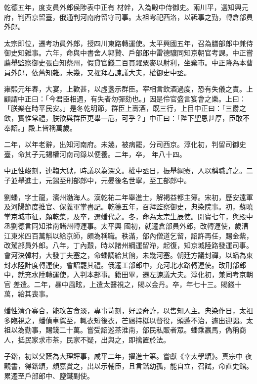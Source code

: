 \begin{pinyinscope}
 乾德五年，度支員外郎侯陟表中正有
 材幹，入為殿中侍御史。兩川平，選知興元府，判西京留臺，俄通判河南府留守司事。太祖雩祀西洛，以祗事之勤，轉倉部員外郎。



 太宗即位，遷考功員外郎，授四川東路轉運使。太平興國五年，召為膳部郎中兼侍御史知雜事。六年，命與中書舍人郭贄、戶部郎中雷德驤同知京朝官考課。中正嘗薦舉監察御史張白知蔡州，假貸官錢二百貫糴粟麥以射利，坐棄市。中正降為本曹員外郎，依舊知雜。未幾，又擢拜右諫議大夫，權御史中丞。



 雍熙元年春，大宴，上歡甚，以虛盞示群臣。宰相言飲酒過度，恐有失儀之責。上顧謂中正曰：「今君臣相遇，有失者勿彈劾也。」因是伶官盛言宴會之樂。上曰：「朕樂在時平民安。」是冬乾明節，群臣上壽酒，既三行，上目中正曰：「三爵之飲，實惟常禮，朕欲與群臣更舉一卮，可乎？」中正曰：「陛下聖恩甚厚，臣敢不奉詔。」殿上皆稱萬歲。



 二年，以年老辭，出知河南府。未幾，被病罷，分司西京。淳化初，判留司御史臺，命其子元錫權河南司錄以便養。二年，卒，
 年八十四。



 中正性峻刻，連鞫大獄，時議以為深文。權中丞日，振舉綱憲，人以稱職許之。二子並舉進士，元錫至刑部郎中，元晏後名世寧，至工部郎中。



 劉蟠，字士龍，濱州渤海人。漢乾祐二年舉進士，解褐益都主簿。宋初，歷安遠軍及河陽節度推官、保義軍掌書記。乾德五年，召拜監察御史，典染院事。初，蘇曉掌京城市征，頗乾集，及卒，選蟠代之。冬，命為太宗生辰使。開寶七年，與殿中丞劉德言同知淮南諸州轉運事。太平興
 國初，就遷倉部員外郎，改轉運使，歲漕江東米四百萬斛以給京師，頗為稱職。秩滿，部內僧道乞留，詔許再任，賜金紫，改駕部員外郎。八年，丁內艱，時以諸州綱運留滯，起復，知京城陸路發運司事。會河決韓村，大發丁夫塞之，命蟠調給其餉，未幾河塞。朝廷方議封禪，以蟠為東封水陸計度轉運使，會詔罷其禮。俄遷工部郎中，充河北水路轉運使。改刑部郎中，就充水陸轉運使，入判本部事。籍田畢，遷左諫議大夫。淳化初，兼同考京朝官
 差遣。二年，暴中風眩，上遣太醫視之，賜以金丹。卒，年七十三。賜錢十萬，給其喪事。



 蟠性清介寡合，能攻苦食淡，專事苛刻，好設奇詐，以售知人主。典染作日，太祖多臨視之，蟠偵車駕至，輒衣短後衣，芒屩持梃以督役，頭蓬不治，遽出迎謁。太祖以為勤事，賜錢二十萬。嘗受詔巡茶淮南，部民私販者眾。蟠乘羸馬，偽稱商人，抵民家求市茶，民家不疑，出與之，即擒置於法。



 子鍇，初以父蔭為大理評事，咸平二年，擢進士第。嘗獻《幸太學頌》。真宗中
 夜觀書，得鍇頌，頗嘉賞之，出以示輔臣，且言鍇幼孤，能自立，召試，命直史館。累遷至戶部郎中、鹽鐵副使。




\end{pinyinscope}
